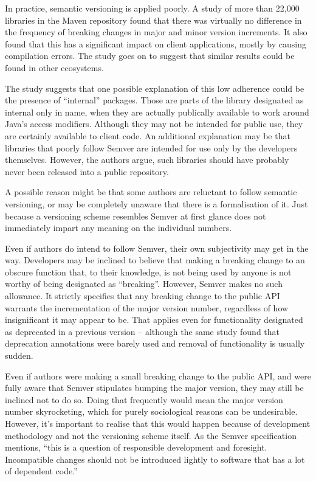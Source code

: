 \documentclass{l4proj}
\begin{document}
In practice, semantic versioning is applied poorly. A
study \cite{SemverMaven} of more than 22,000 libraries in the Maven
repository found that there was virtually no difference in the
frequency of breaking changes in major and minor version increments.
It also found that this has a significant impact on client
applications, mostly by causing compilation errors. The study goes on
to suggest that similar results could be found in other ecosystems.

The study suggests that one possible explanation of this low adherence
could be the presence of ``internal'' packages. Those are parts of the
library designated as internal only in name, when they are actually
publically available to work around Java's access modifiers. Although
they may not be intended for public use, they are certainly available
to client code. An additional explanation may be that libraries that
poorly follow Semver are intended for use only by the developers
themselves. However, the authors argue, such libraries should have
probably never been released into a public repository.

A possible reason might be that some authors are reluctant to follow
semantic versioning, or may be completely unaware that there is a
formalisation of it. Just because a versioning scheme resembles Semver
at first glance does not immediately impart any meaning on the
individual numbers.

Even if authors do intend to follow Semver, their own subjectivity may
get in the way. Developers may be inclined to believe that making a
breaking change to an obscure function that, to their knowledge, is
not being used by anyone is not worthy of being designated as
``breaking''. However, Semver makes no such allowance. It strictly
specifies that any breaking change to the public API warrants
the incrementation of the major version number, regardless of how
insignificant it may appear to be. That applies even for functionality
designated as deprecated in a previous version -- although the same
study found that deprecation annotations were barely used and removal
of functionality is usually sudden.

Even if authors were making a small breaking change to the public API,
and were fully aware that Semver stipulates bumping the major version,
they may still be inclined not to do so. Doing that frequently would
mean the major version number skyrocketing, which for purely
sociological reasons can be undesirable. However, it's important to
realise that this would happen because of development methodology and
not the versioning scheme itself. As the Semver specification
mentions, ``this is a question of responsible development and
foresight. Incompatible changes should not be introduced lightly to
software that has a lot of dependent code.''
\end{document}
